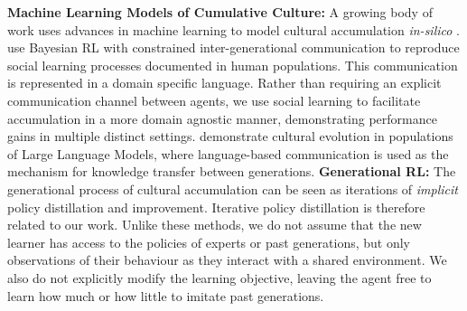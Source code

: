 \documentclass{article}
\begin{document}
\textbf{Machine Learning Models of Cumulative Culture:} A growing body of work uses advances in machine learning to model cultural accumulation \textit{in-silico} \citep{prystawski23, perez23, perez24}. \cite{perez24} use Bayesian RL with constrained inter-generational communication to reproduce social learning processes documented in human populations. This communication is represented in a domain specific language. Rather than requiring an explicit communication channel between agents, we use social learning to facilitate accumulation in a more domain agnostic manner, demonstrating performance gains in multiple distinct settings. \cite{prystawski23} demonstrate cultural evolution in populations of Large Language Models, where language-based communication is used as the mechanism for knowledge transfer between generations.
\textbf{Generational RL:} The generational process of cultural accumulation can be seen as iterations of \textit{implicit} policy distillation and improvement. Iterative policy distillation  \citep{schmitt2018kickstarting, Stooke21} is therefore related to our work. Unlike these methods, we do not assume that the new learner has access to the policies of experts or past generations, but only observations of their behaviour as they interact with a shared environment. We also do not explicitly modify the learning objective, leaving the agent free to learn how much or how little to imitate past generations.
\end{document}
